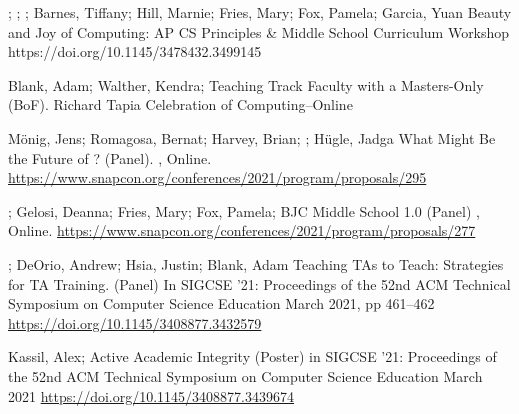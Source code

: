 \begin{etaremune}
    \sigcsePVD
        {\me; \lauren; \dan; Barnes, Tiffany; Hill, Marnie; Fries, Mary; Fox, Pamela; Garcia, Yuan}
        {Beauty and Joy of Computing: AP CS Principles \& Middle School Curriculum}
        {Workshop}
        {https://doi.org/10.1145/3478432.3499145}
    
    \item{Blank, Adam; Walther, Kendra; \me \newline Teaching Track Faculty with a Masters-Only (BoF).
     Richard Tapia Celebration of Computing–Online
    }
    
    \item{Mönig, Jens; Romagosa, Bernat; Harvey, Brian; \me; Hügle, Jadga
    \newline
    What Might Be the Future of \snap? (Panel). , Online.
    \newline
    \href{https://www.snapcon.org/conferences/2021/program/proposals/295}{https://www.snapcon.org/conferences/2021/program/proposals/295}}
    
    \item{\dan; Gelosi, Deanna; Fries, Mary; Fox, Pamela; \me
    \newline BJC Middle School 1.0 (Panel)
    , Online.
    \newline
    \href{https://www.snapcon.org/conferences/2021/program/proposals/277}{https://www.snapcon.org/conferences/2021/program/proposals/277}}

    \item{\me; DeOrio, Andrew; Hsia, Justin; Blank, Adam
    \newline Teaching TAs to Teach: Strategies for TA Training. (Panel) \newline 
    In SIGCSE '21: Proceedings of the 52nd ACM Technical Symposium on Computer Science Education March 2021, pp 461–462
    \newline
    \href{https://doi.org/10.1145/3408877.3432579}{https://doi.org/10.1145/3408877.3432579}}

    \item{Kassil, Alex; \me
    \newline Active Academic Integrity (Poster)
    \newline in SIGCSE '21: Proceedings of the 52nd ACM Technical Symposium on Computer Science Education March 2021 
    \newline
    \href{https://doi.org/10.1145/3408877.3439674}{https://doi.org/10.1145/3408877.3439674}
    }


\end{etaremune}
